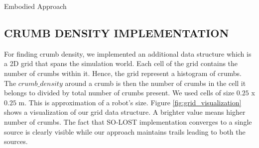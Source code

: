 \documentclass[letterpaper, 10 pt, conference]{ieeeconf}  %
\makeatletter
\def\BState{\State\hskip-\ALG@thistlm}
\makeatother
\begin{document}
\begin{algorithm}
\caption{Embodied Approach}\label{algorithm:1}
\end{algorithm}

\subsection{CRUMB DENSITY IMPLEMENTATION}

For finding crumb density, we implemented an additional data structure which is a 2D grid that spans the simulation world. Each cell of the grid contains the number of crumbs within it. Hence, the grid represent a histogram of crumbs. The $crumb\_density$ around a crumb is then the number of crumbs in the cell it belongs to divided by total number of crumbs present. We used cells of size $0.25$ x $ 0.25$  m. This is approximation of a robot's size. Figure \ref{fig:grid_visualization} shows a visualization of our grid data structure. A brighter value means higher number of crumbs. The fact that SO-LOST implementation converges to a single source is clearly visible while our approach maintains trails leading to both the sources.
\end{document}

